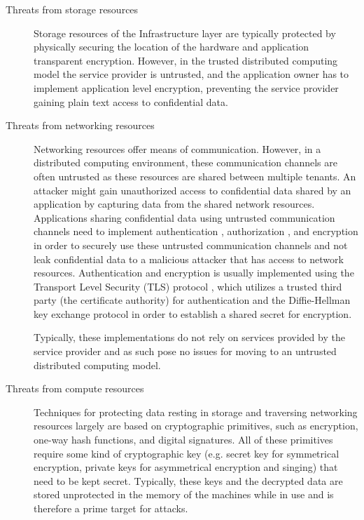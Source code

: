 \begin{description}
  \item[Threats from storage resources]
    Storage resources of the Infrastructure layer are typically protected by
    physically securing the location of the hardware and application transparent
    encryption. However, in the trusted distributed computing model the
    service provider is untrusted, and the application owner has to implement
    application level encryption, preventing the service provider gaining plain
    text access to confidential data.

  \item[Threats from networking resources]
    Networking resources offer means of communication. However, in a distributed
    computing environment, these communication channels are often untrusted as
    these resources are shared between multiple tenants. An attacker might gain
    unauthorized access to confidential data shared by an application by
    capturing data from the shared network resources. Applications sharing
    confidential data using untrusted communication channels need to implement
    authentication \cite{lampson1992authentication}, authorization
    \cite{woo1992authorization}, and encryption in order to securely use these
    untrusted communication channels and not leak confidential data to a
    malicious attacker that has access to network resources. Authentication and
    encryption is usually implemented using the Transport Level Security (TLS)
    protocol \cite{rfc5246}, which utilizes a trusted third party (the
    certificate authority) for authentication and the Diffie-Hellman key
    exchange protocol in order to establish a shared secret for encryption.

    Typically, these implementations do not rely on services provided by the
    service provider and as such pose no issues for moving to an untrusted
    distributed computing model.

  \item[Threats from compute resources]
    Techniques for protecting data resting in storage and traversing networking
    resources largely are based on cryptographic primitives, such as encryption,
    one-way hash functions, and digital signatures. All of these primitives
    require some kind of cryptographic key (e.g. secret key for symmetrical
    encryption, private keys for asymmetrical encryption and singing) that need
    to be kept secret. Typically, these keys and the decrypted data are stored
    unprotected in the memory of the machines while in use and is therefore a
    prime target for attacks.


\end{description}
